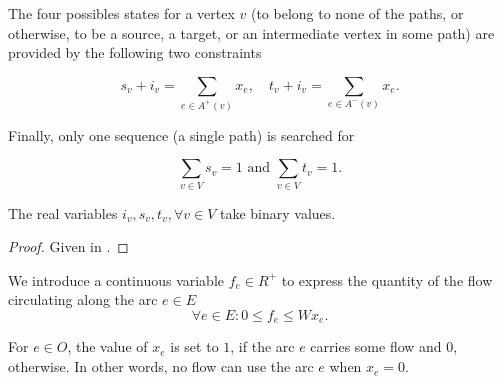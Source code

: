 \documentclass{endmH}
\newcommand{\forLaterVersions}[1]{}
\begin{document}
The four possibles states for a vertex $v$ (to belong to none of the paths, or otherwise, to be a source, a target,  or an intermediate  vertex in some path) are provided by the following  two constraints 

 \begin{equation}\label{output-edges}
s_v + i_v =  \sum_{e\in A^{+}(v)} x_e,  %
% 
\quad
% 
t_v  + i_v = \sum_{e\in A^{-}(v)} x_e. %
  \end{equation}
  
    
   Finally, only one sequence (a single path) is searched for 
    
        \begin{equation}\label{one_paths}
      \sum_{v \in V} s_v = 1  \mbox{ and }  \sum_{v \in V} t_v = 1.
       \end{equation}
                  
           
  
    \begin{theorem}\label{vertices_are_binary}
    The real variables $ i_v, s_v, t_v, \forall v \in V$ take binary values.
    \end{theorem}
   \begin{proof} Given in \cite{RR_9050}.
   \end{proof}
                      
   We introduce a continuous variable $f_e \in  R^+$ to express the quantity of the flow circulating along the arc $e \in E$
%                             
  \begin{equation}\label{flow_condition}
  \forall e \in E:  0 \leq f_e \leq Wx_e.   %
  \end{equation}
                                
                     
  
  For $e\in O$, the value of $x_e$ is set to  $1$, if the arc $e$ carries some  flow and $0$, otherwise. In other words, no  flow can use  the arc $e$ when $x_e = 0$. \forLaterVersions {as ensured by constraint} %
\forLaterVersions{
       \begin{equation}\label{flow_capacity}
    f_e \leq W x_e  ~~~~ \forall e \in O.
       \end{equation}
}
       
\end{document}
